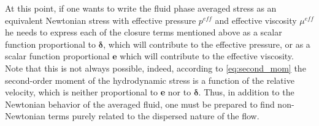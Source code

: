 
At this point, if one wants to write the fluid phase averaged stress as an equivalent Newtonian stress with effective pressure $p^{eff}$ and effective viscosity $\mu^{eff}$ he needs to express each of the closure terms mentioned above as a scalar function proportional to $\bm\delta$, which will contribute to the effective pressure, or as a scalar function proportional $\textbf{e}$ which will contribute to the effective viscosity. 
Note that this is not always possible, indeed, according to \ref{eq:second_mom} the second-order moment of the hydrodynamic stress is a function of the relative velocity, which is neither proportional to \textbf{e} nor to $\bm\delta$. 
Thus, in addition to the Newtonian behavior of the averaged fluid, one must be prepared to find non-Newtonian terms purely related to the dispersed nature of the flow. 

